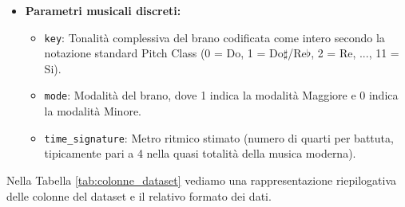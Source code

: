 \begin{itemize}
\begin{itemize}
        \item \texttt{liveness}: Valore tra 0.0 e 1.0 che rileva la presenza di un pubblico nella registrazione; valori superiori a 0.8 indicano un'alta probabilità di performance dal vivo.
        \item \texttt{valence}: Valore da 0.0 a 1.0 che descrive la positività musicale trasmessa dalla traccia: valori alti indicano euforia, allegria e serenità, mentre valori bassi denotano tristezza, rabbia o tensione emotiva.
        \item \texttt{tempo}: Velocità stimata del brano espressa in battiti al minuto (BPM).
        \item \texttt{duration\_ms}: Durata temporale complessiva del brano espressa in millisecondi.
    \end{itemize}
    \item \textbf{Parametri musicali discreti:}
    \begin{itemize}
        \item \texttt{key}: Tonalità complessiva del brano codificata come intero secondo la notazione standard Pitch Class (0 = Do, 1 = Do$\sharp$/Re$\flat$, 2 = Re, ..., 11 = Si).
        \item \texttt{mode}: Modalità del brano, dove 1 indica la modalità Maggiore e 0 indica la modalità Minore.
        \item \texttt{time\_signature}: Metro ritmico stimato (numero di quarti per battuta, tipicamente pari a 4 nella quasi totalità della musica moderna).
    \end{itemize}
\end{itemize}

Nella Tabella \ref{tab:colonne_dataset} vediamo una rappresentazione riepilogativa delle colonne del dataset e il relativo formato dei dati.

